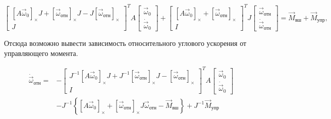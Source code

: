 \begin{equation}
    \begin{bmatrix}
        [A\vec{\omega}_0]_{\times} J + [\vec{\omega}_{\text{отн}}]_{\times} J - J[\vec{\omega}_{\text{отн}}]_{\times} \\
        J
    \end{bmatrix}^T A \begin{bmatrix}
        \vec{\omega}_0 \\
        \dot{\vec{\omega}}_0
    \end{bmatrix} + \begin{bmatrix}
        [A\vec{\omega}_0]_{\times} + [\vec{\omega}_{\text{отн}}]_{\times} \\
        I
    \end{bmatrix}^T J \begin{bmatrix}
        \vec{\omega}_{\text{отн}} \\
        \dot{\vec{\omega}}_{\text{отн}}
    \end{bmatrix}
    = \vec{M}_{\text{вш}} + \vec{M}_{\text{упр}},
\end{equation}\par
    Отсюда возможно вывести зависимость относительного углового ускорения от
управляющего момента.\par
\begin{equation}
    \begin{aligned}
        \dot{\vec{\omega}}_{\text{отн}} =&
            - \begin{bmatrix}
                J^{-1}[A\vec{\omega}_0]_{\times} J + J^{-1}[\vec{\omega}_{\text{отн}}]_{\times} J - [\vec{\omega}_{\text{отн}}]_{\times} \\
                I
            \end{bmatrix}^T A \begin{bmatrix}
                \vec{\omega}_0 \\
                \dot{\vec{\omega}}_0
            \end{bmatrix} \\
        & -J^{-1} \left\{
            [A\vec{\omega}_0]_{\times} + [\vec{\omega}_{\text{отн}}]_{\times} J \vec{\omega}_{\text{отн}}
            - \vec{M}_{\text{вш}}
        \right\}
        + J^{-1}\vec{M}_{\text{упр}}
    \end{aligned}
\end{equation}
